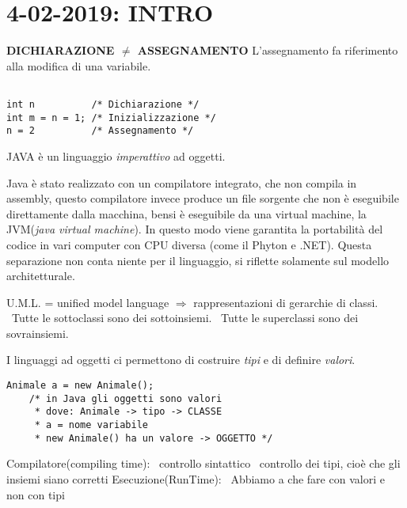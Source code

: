 

\newpage
\section{4-02-2019: INTRO}
\textbf{DICHIARAZIONE $\neq$ ASSEGNAMENTO} \newline
L'assegnamento fa riferimento alla modifica di una variabile.
\begin{lstlisting}[basicstyle=\small,]

int n		   /* Dichiarazione */
int m = n = 1; /* Inizializzazione */
n = 2 		   /* Assegnamento */

\end{lstlisting}
JAVA è un linguaggio \textit{imperattivo} ad oggetti.

\noindent Java è stato realizzato con un compilatore integrato, che non compila in assembly, questo compilatore invece produce un file sorgente che non è eseguibile direttamente dalla macchina, bensi è eseguibile da una virtual machine, la JVM(\textit{java virtual machine}). In questo modo viene garantita la portabilità del codice in vari computer con CPU diversa (come il Phyton e .NET). \newline
Questa separazione non conta niente per il linguaggio, si riflette solamente sul modello architetturale.

\noindent U.M.L. = unified model language $\Rightarrow$ rappresentazioni di gerarchie di classi. \newline
{} \newline
\textbullet\ Tutte le sottoclassi sono dei sottoinsiemi. \newline
\textbullet\ Tutte le superclassi sono dei sovrainsiemi. 

\noindent I linguaggi ad oggetti ci permettono di costruire \textit{tipi} e di definire \textit{valori}. 
\begin{lstlisting}[basicstyle=\small,]
	Animale a = new Animale();
	/* in Java gli oggetti sono valori
	 * dove: Animale -> tipo -> CLASSE
	 * a = nome variabile
	 * new Animale() ha un valore -> OGGETTO */
\end{lstlisting}

\noindent Compilatore(compiling time): \newline
\textbullet\ controllo sintattico \newline
\textbullet\ controllo dei tipi, cioè che gli insiemi siano corretti \newline
Esecuzione(RunTime):\newline
\textbullet\ Abbiamo a che fare con valori e non con tipi

